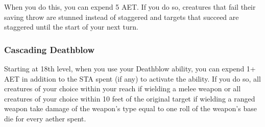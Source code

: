 When you do this, you can expend 5 AET. If you do so, creatures that fail their saving throw are stunned instead of staggered and targets that succeed are staggered until the start of your next turn.

\subsubsection{Cascading Deathblow}
Starting at 18th level, when you use your Deathblow ability, you can expend 1+ AET in addition to the STA spent (if any) to activate the ability. If you do so, all creatures of your choice within your reach if wielding a melee weapon or all creatures of your choice within 10 feet of the original target if wielding a ranged weapon take damage of the weapon's type equal to one roll of the weapon's base die for every aether spent.